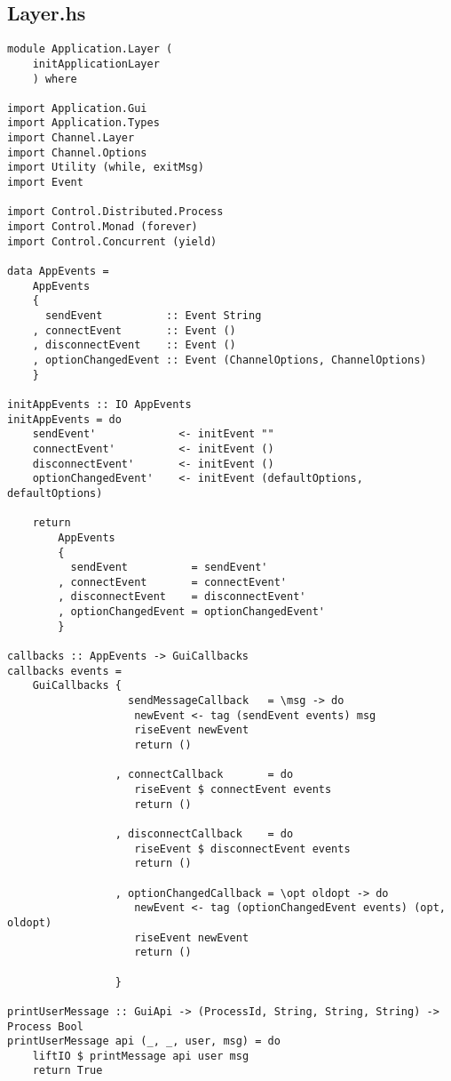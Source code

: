 \documentclass[russian,utf8,simple,emptystyle]{eskdtext}
\begin{document}
\subsection{Layer.hs}
\begin{lstlisting}
module Application.Layer (
    initApplicationLayer
    ) where

import Application.Gui 
import Application.Types 
import Channel.Layer
import Channel.Options 
import Utility (while, exitMsg)
import Event

import Control.Distributed.Process
import Control.Monad (forever)
import Control.Concurrent (yield)

data AppEvents = 
    AppEvents
    {
      sendEvent          :: Event String
    , connectEvent       :: Event ()
    , disconnectEvent    :: Event ()
    , optionChangedEvent :: Event (ChannelOptions, ChannelOptions)
    }

initAppEvents :: IO AppEvents
initAppEvents = do 
    sendEvent'             <- initEvent ""
    connectEvent'          <- initEvent ()
    disconnectEvent'       <- initEvent ()
    optionChangedEvent'    <- initEvent (defaultOptions, defaultOptions)

    return 
        AppEvents
        {
          sendEvent          = sendEvent'
        , connectEvent       = connectEvent'
        , disconnectEvent    = disconnectEvent'
        , optionChangedEvent = optionChangedEvent'
        }

callbacks :: AppEvents -> GuiCallbacks
callbacks events = 
    GuiCallbacks {
                   sendMessageCallback   = \msg -> do
                    newEvent <- tag (sendEvent events) msg
                    riseEvent newEvent
                    return ()

                 , connectCallback       = do 
                    riseEvent $ connectEvent events
                    return ()

                 , disconnectCallback    = do
                    riseEvent $ disconnectEvent events
                    return ()

                 , optionChangedCallback = \opt oldopt -> do 
                    newEvent <- tag (optionChangedEvent events) (opt, oldopt)
                    riseEvent newEvent
                    return ()

                 }

printUserMessage :: GuiApi -> (ProcessId, String, String, String) -> Process Bool
printUserMessage api (_, _, user, msg) = do 
    liftIO $ printMessage api user msg 
    return True


\end{lstlisting}
\end{document}
